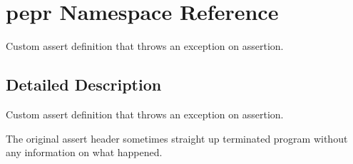 \hypertarget{namespacepepr}{}\section{pepr Namespace Reference}
\label{namespacepepr}


Custom assert definition that throws an exception on assertion.  




\subsection{Detailed Description}
Custom assert definition that throws an exception on assertion. 

The original assert header sometimes straight up terminated program without any information on what happened. 